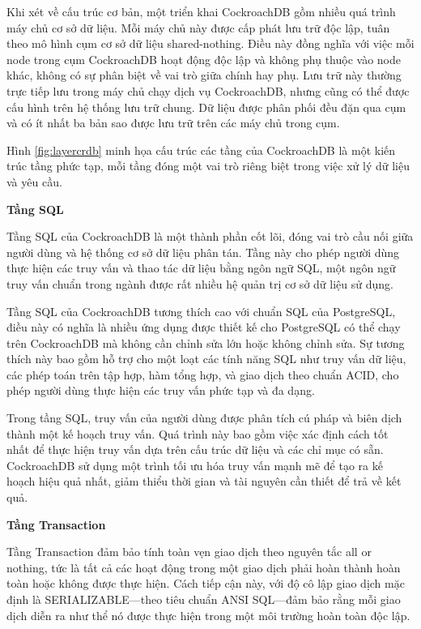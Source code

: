 \documentclass{article}[13pt]
\begin{document}
Khi xét về cấu trúc cơ bản, một triển khai CockroachDB gồm nhiều quá trình máy chủ cơ sở dữ liệu. Mỗi máy chủ này được cấp phát lưu trữ độc lập, tuân theo mô hình cụm cơ sở dữ liệu shared-nothing. Điều này đồng nghĩa với việc mỗi node trong cụm CockroachDB hoạt động độc lập và không phụ thuộc vào node khác, không có sự phân biệt về vai trò giữa chính hay phụ. Lưu trữ này thường trực tiếp lưu trong máy chủ chạy dịch vụ CockroachDB, nhưng cũng có thể được cấu hình trên hệ thống lưu trữ chung. Dữ liệu được phân phối đều đặn qua cụm và có ít nhất ba bản sao được lưu trữ trên các máy chủ trong cụm.


Hình \ref{fig:layercrdb} minh họa cấu trúc các tầng của CockroachDB là một kiến trúc tầng phức tạp, mỗi tầng đóng một vai trò riêng biệt trong việc xử lý dữ liệu và yêu cầu.

\textbf{Tầng SQL}

Tầng SQL của CockroachDB là một thành phần cốt lõi, đóng vai trò cầu nối giữa người dùng và hệ thống cơ sở dữ liệu phân tán. Tầng này cho phép người dùng thực hiện các truy vấn và thao tác dữ liệu bằng ngôn ngữ SQL, một ngôn ngữ truy vấn chuẩn trong ngành được rất nhiều hệ quản trị cơ sở dữ liệu sử dụng.

Tầng SQL của CockroachDB tương thích cao với chuẩn SQL của PostgreSQL, điều này có nghĩa là nhiều ứng dụng được thiết kế cho PostgreSQL có thể chạy trên CockroachDB mà không cần chỉnh sửa lớn hoặc không chỉnh sửa. Sự tương thích này bao gồm hỗ trợ cho một loạt các tính năng SQL như truy vấn dữ liệu, các phép toán trên tập hợp, hàm tổng hợp, và giao dịch theo chuẩn ACID, cho phép người dùng thực hiện các truy vấn phức tạp và đa dạng.

Trong tầng SQL, truy vấn của người dùng được phân tích cú pháp và biên dịch thành một kế hoạch truy vấn. Quá trình này bao gồm việc xác định cách tốt nhất để thực hiện truy vấn dựa trên cấu trúc dữ liệu và các chỉ mục có sẵn. CockroachDB sử dụng một trình tối ưu hóa truy vấn mạnh mẽ để tạo ra kế hoạch hiệu quả nhất, giảm thiểu thời gian và tài nguyên cần thiết để trả về kết quả.


\textbf{Tầng Transaction}

Tầng Transaction đảm bảo tính toàn vẹn giao dịch theo nguyên tắc all or nothing, tức là tất cả các hoạt động trong một giao dịch phải hoàn thành hoàn toàn hoặc không được thực hiện. Cách tiếp cận này, với độ cô lập giao dịch mặc định là SERIALIZABLE—theo tiêu chuẩn ANSI SQL—đảm bảo rằng mỗi giao dịch diễn ra như thể nó được thực hiện trong một môi trường hoàn toàn độc lập.
\end{document}
